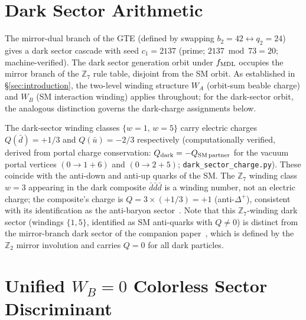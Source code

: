 \documentclass[11pt]{article}
\theoremstyle{remark}
\begin{document}


\section{Dark Sector Arithmetic}
\label{sec:dark}

The mirror-dual branch of the GTE (defined by swapping $b_2 = 42 \leftrightarrow q_2 = 24$)
gives a dark sector cascade with seed $c_1 = 2137$ (prime; $2137 \bmod 73 = 20$;
machine-verified). The dark sector generation orbit under $f_{\rm MDL}$ occupies the
mirror branch of the $\mathbb{Z}_7$ rule table, disjoint from the SM orbit.
As established in \S\ref{sec:introduction}, the two-level winding structure
$W_A$ (orbit-sum beable charge) and $W_B$ (SM interaction winding) applies throughout;
for the dark-sector orbit, the analogous distinction governs the dark-charge assignments below.

The dark-sector winding classes $\{w=1,\, w=5\}$ carry electric charges
$Q(\bar{d}) = +1/3$ and $Q(\bar{u}) = -2/3$ respectively (computationally verified, derived from
portal charge conservation: $Q_{\rm dark} = -Q_{\rm SM\,partner}$ for the vacuum
portal vertices $(0 \to 1+6)$ and $(0 \to 2+5)$;
\texttt{dark\_sector\_charge.py}).
These coincide with the anti-down and anti-up quarks of the SM.
The $\mathbb{Z}_7$ winding class $w=3$ appearing in the dark composite
$\bar{d}\bar{d}\bar{d}$ is a winding number, not an electric charge; the
composite's charge is $Q = 3\times(+1/3) = +1$ (anti-$\Delta^+$), consistent
with its identification as the anti-baryon sector~\cite{SpivackMirrorBraidAtlas}.
Note that this $\mathbb{Z}_7$-winding dark sector (windings $\{1,5\}$, identified as SM anti-quarks with $Q \neq 0$) is distinct from the mirror-branch dark sector of the companion paper~\cite{SpivackMirrorBraidAtlas}, which is defined by the $\mathbb{Z}_2$ mirror involution and carries $Q = 0$ for all dark particles.

\section{Unified $W_B{=}0$ Colorless Sector Discriminant}
\label{sec:colorless-discriminant}
\end{document}
